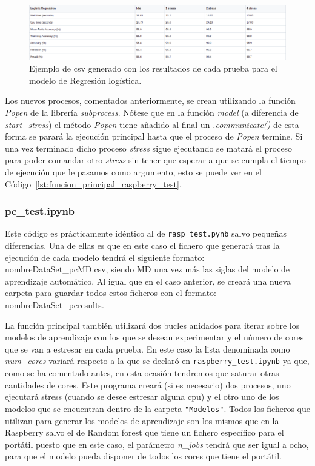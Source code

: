 \documentclass[a4paper, 12pt]{book}
\begin{document}
\begin{figure}[]
  \centering
  \includegraphics[width=16cm, keepaspectratio]{img/ejemplo_csv.png}
  \caption{Ejemplo de csv generado con los resultados de cada prueba para el modelo de Regresión logística.}\label{fig:ejemplo_csv}
\end{figure}

Los nuevos procesos, comentados anteriormente, se crean utilizando la función \textit{Popen} de la librería \textit{subprocess}. Nótese que en la función \textit{model} (a diferencia de \textit{start\_stress}) el método \textit{Popen} tiene añadido al final un \textit{.communicate()} de esta forma se parará la ejecución principal hasta que el proceso de \textit{Popen} termine. Si una vez terminado dicho proceso \textit{stress} sigue ejecutando se matará el proceso para poder comandar otro \textit{stress} sin tener que esperar a que se cumpla el tiempo de ejecución que le pasamos como argumento, esto se puede ver en el Código~\ref{lst:funcion_principal_raspberry_test}.

\subsubsection{pc\_test.ipynb}
\label{subsubsec:programa_pruebas_pc}

Este código es prácticamente idéntico al de \texttt{rasp\_test.pynb} salvo pequeñas diferencias. Una de ellas es que en este caso el fichero que generará tras la ejecución de cada modelo tendrá el siguiente formato: nombreDataSet\_pcMD.csv, siendo MD una vez más las siglas del modelo de aprendizaje automático. Al igual que en el caso anterior, se creará una nueva carpeta para guardar todos estos ficheros con el formato: nombreDataSet\_pcresults.

La función principal también utilizará dos bucles anidados para iterar sobre los modelos de aprendizaje con los que se desean experimentar y el número de cores que se van a estresar en cada prueba. En este caso la lista denominada como \textit{num\_cores} variará respecto a la que se declaró en \texttt{raspberry\_test.ipynb} ya que, como se ha comentado antes, en esta ocasión tendremos que saturar otras cantidades de cores. Este programa creará (si es necesario) dos procesos, uno ejecutará stress (cuando se desee estresar alguna cpu) y el otro uno de los modelos que se encuentran dentro de la carpeta \texttt{"Modelos"}. Todos los ficheros que utilizan para generar los modelos de aprendizaje son los mismos que en la Raspberry salvo el de Random forest que tiene un fichero específico para el portátil puesto que en este caso, el parámetro \textit{n\_jobs} tendrá que ser igual a ocho, para que el modelo pueda disponer de todos los cores que tiene el portátil. 
\end{document}
